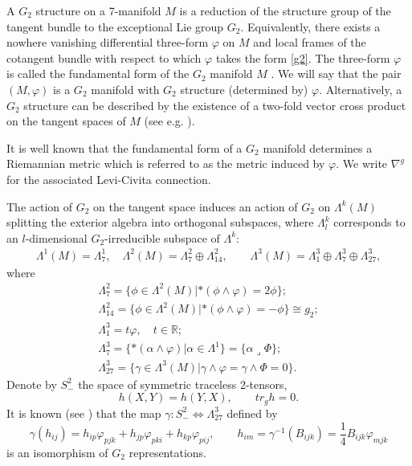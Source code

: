 \documentclass[10pt,british]{article}
\def\LC{{\nabla^g}}
\def\p{{\varphi}}
\def\ph{{\Phi}}
\begin{document}
A $G_2$ structure on a 7-manifold $M$ is a reduction of the structure group
of the tangent bundle to the exceptional Lie group $G_2$. Equivalently, there exists a nowhere
vanishing differential three-form $\p$ on $M$ and local frames of the cotangent bundle with
respect to which $\p$ takes the form \eqref{g2}. The three-form $\p$ is called the fundamental
form of the $G_2$ manifold $M$ \cite{Bo}.
We will say that the pair $(M, \p)$ is a $G_2$ manifold with $G_2$ structure (determined
by) $\p$.  Alternatively, a $G_2$ structure can be described by the existence of a two-fold
vector cross product  on the tangent spaces of $M$ (see e.g. \cite{Gr}).

It is well known that the fundamental form of a $G_2$ manifold determines a Riemannian metric which  is referred to as the metric induced by $\p$. We write $\LC$ for the associated Levi-Civita
connection. %


The action of $G_2$  on the tangent space induces an
action of $G_2$ on $\Lambda^k(M)$ splitting the exterior algebra into orthogonal subspaces, where
$\Lambda^k_l$ corresponds to an $l$-dimensional $G_2$-irreducible subspace of $\Lambda^k$:
\begin{equation*}\label{dec}
\begin{split}
\Lambda^1(M)=\Lambda^1_7,  \quad \Lambda^2(M)=\Lambda^2_7\oplus\Lambda^2_{14}, \qquad \Lambda^3(M)=\Lambda^3_1\oplus\Lambda^3_7\oplus\Lambda^3_{27},
\end{split}
\end{equation*}
where
\begin{equation}\label{dec2}
\begin{split}
\Lambda^2_7=\{\phi\in \Lambda^2(M) | *(\phi\wedge\p)=2\phi\};\\
\Lambda^2_{14}=\{\phi\in \Lambda^2(M) | *(\phi\wedge\p)=-\phi\}\cong g_2;\\
\Lambda^3_1=t\p,\quad t\in \mathbb R;\\
\Lambda^3_7=\{*(\alpha\wedge\p) |  \alpha\in\Lambda^1\}=\{\alpha\lrcorner\ph\};\\
\Lambda^3_{27}=\{\gamma\in \Lambda^3(M) | \gamma\wedge\p=\gamma\wedge\ph=0\}.
\end{split}
\end{equation}
Denote by $S^2_-$ the space of symmetric traceless 2-tensors, 
\begin{equation}\label{2s}
h(X,Y)=h(Y,X),\qquad tr_gh=0.
\end{equation}
It is known (see \cite{Br1,Kar,Kar1}) that the map $\gamma: S^2_-\Leftrightarrow \Lambda^3_{27}$ defined by 
\begin{equation}\label{s12}
\gamma(h_{ij})=h_{ip}\p_{pjk}+h_{jp}\p_{pki}+h_{kp}\p_{pij},\qquad  h_{im}=\gamma^{-1}(B_{ijk})=\frac14B_{ijk}\p_{mjk}
\end{equation}
is an isomorphism of $G_2$ representations.
\end{document}
